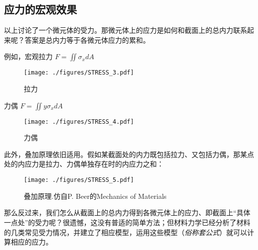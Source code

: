 \subsection{应力的宏观效果}
以上讨论了一个微元体的受力。那微元体上的应力是如何和截面上的总内力联系起来呢？答案是总内力等于各微元体应力的累和。

例如，宏观拉力 $F = \iint \sigma_x dA$
\begin{figure}[ht]
\centering
\texttt{[image: ./figures/STRESS\_3.pdf]}
\caption{拉力} \label{STRESS_fig3}
\end{figure}

力偶 $F = \iint y\sigma_x dA$
\begin{figure}[ht]
\centering
\texttt{[image: ./figures/STRESS\_4.pdf]}
\caption{力偶} \label{STRESS_fig4}
\end{figure}

此外，叠加原理依旧适用。假如某截面处的内力既包括拉力、又包括力偶，那某点处的内应力是拉力、力偶单独存在时的内应力之和：
\begin{figure}[ht]
\centering
\texttt{[image: ./figures/STRESS\_5.pdf]}
\caption{叠加原理.仿自P. Beer的Mechanics of Materials} \label{STRESS_fig5}
\end{figure}

那么反过来，我们怎么从截面上的总内力得到各微元体上的应力、即截面上“具体一点处”的受力呢？很遗憾，这没有普适的简单方法；但材料力学已经分析了材料的几类常见受力情况，并建立了相应模型，运用这些模型（\textsl{俗称套公式}）就可以计算相应的应力。
